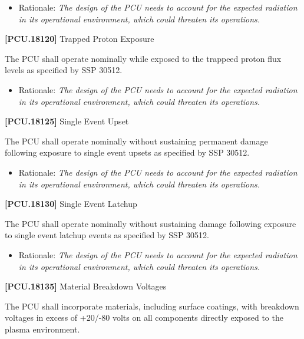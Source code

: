 \documentclass[12pt,oneside,oldfontcommands]{memoir}
\begin{document}
\begin{itemize}
\item{} Rationale: \emph{The design of the PCU needs to account for the expected radiation in its operational environment, which could threaten its operations.}

\end{itemize}

\textbf{[PCU.18120]} Trapped Proton Exposure

The \gls{PCU} shall operate nominally while exposed to the trappeed proton flux levels as specified by SSP 30512.

\begin{itemize}
\item{} Rationale: \emph{The design of the PCU needs to account for the expected radiation in its operational environment, which could threaten its operations.}

\end{itemize}

\textbf{[PCU.18125]} Single Event Upset

The \gls{PCU} shall operate nominally without sustaining permanent damage following exposure to single event upsets as specified by SSP 30512.

\begin{itemize}
\item{} Rationale: \emph{The design of the PCU needs to account for the expected radiation in its operational environment, which could threaten its operations.}

\end{itemize}

\textbf{[PCU.18130]} Single Event Latchup

The \gls{PCU} shall operate nominally without sustaining damage following exposure to single event latchup events as specified by SSP 30512.

\begin{itemize}
\item{} Rationale: \emph{The design of the PCU needs to account for the expected radiation in its operational environment, which could threaten its operations.}

\end{itemize}

\textbf{[PCU.18135]} Material Breakdown Voltages

The \gls{PCU} shall incorporate materials, including surface coatings, with breakdown voltages in excess of +20\slash -80 volts on all components directly exposed to the plasma environment.
\end{document}

